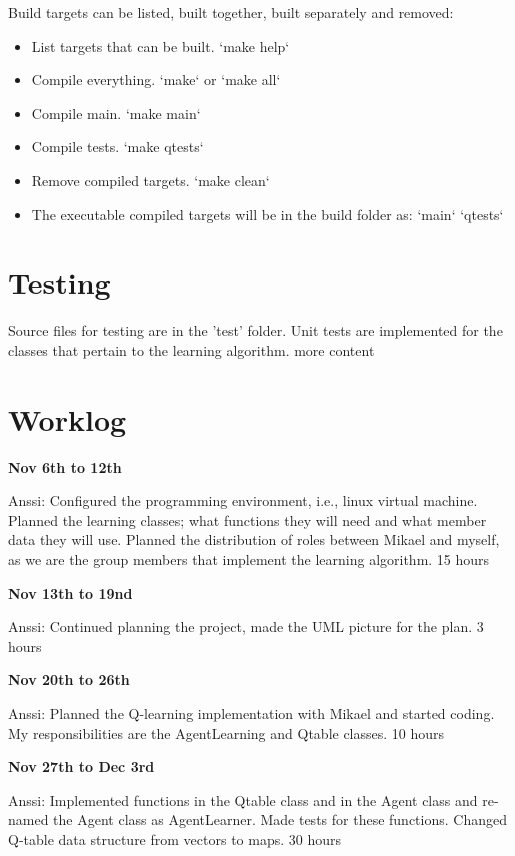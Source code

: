\documentclass{article}
\begin{document}
Build targets can be listed, built together, built separately and removed:

\begin{itemize}
  \item List targets that can be built.
`make help`

 \item Compile everything.
`make` or `make all`

 \item Compile main.
`make main`

 \item Compile tests.
`make qtests`

 \item Remove compiled targets.
`make clean`

 \item The executable compiled targets will be in the build folder as:
`main`
`qtests`
\end{itemize}

\section{Testing}

Source files for testing are in the 'test' folder. Unit tests are implemented for
the classes that pertain to the learning algorithm. more content


\section{Worklog}

\textbf{Nov 6th to 12th}

Anssi:
Configured the programming environment, i.e., linux virtual machine. Planned the learning classes; what functions they will need and what member data they will use. Planned the distribution of roles between Mikael and myself, as we are the group members that implement the learning algorithm.
15 hours

\textbf{Nov 13th to 19nd}

Anssi:
Continued planning the project, made the UML picture for the plan.
3 hours

\textbf{Nov 20th to 26th}

Anssi:
Planned the Q-learning implementation with Mikael and started coding. My responsibilities are the AgentLearning and Qtable classes.
10 hours

\textbf{Nov 27th to Dec 3rd}

Anssi:
Implemented functions in the Qtable class and in the Agent class and re-named the Agent class as AgentLearner. Made tests for these functions. Changed Q-table data structure from vectors to maps.
30 hours
\end{document}
